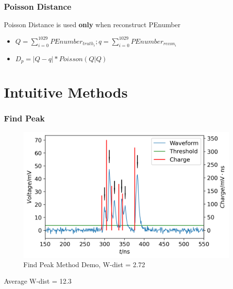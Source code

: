 \documentclass[handout]{beamer}
\begin{document}
\begin{frame}
\frametitle{Poisson Distance}
\hspace{4mm}Poisson Distance is used \textbf{only} when reconstruct PEnumber
\begin{itemize}
    \item $Q = \sum_{i=0}^{1029}PEnumber_{truth_i}; q = \sum_{i=0}^{1029}PEnumber_{recon_i}$
    \item $D_{p} = |Q-q|*Poisson(Q|Q)$
\end{itemize}
\end{frame}

\section{Intuitive Methods}
\begin{frame}
\frametitle{Find Peak}
\begin{figure}
    \centering
    \caption{Find Peak Method Demo, W-dist = 2.72}
    \includegraphics[width=0.9\linewidth]{img/findpeak.png}
\end{figure}
\vspace{-4mm}
\begin{center}
    Average W-dist = 12.3
\end{center}
\end{frame}
\end{document}
